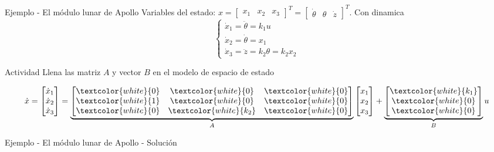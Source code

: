 \documentclass[presentation,aspectratio=1610]{beamer}
\begin{document}
\begin{frame}[label={sec:orga0c19d9}]{Ejemplo - El módulo lunar de Apollo}
Variables del estado: \(x = \begin{bmatrix} x_1 & x_2 & x_3 \end{bmatrix}^T = \begin{bmatrix} \dot{\theta} & \theta & \dot{z} \end{bmatrix}^T\). Con dinamica
\[ \begin{cases} \dot{x}_1 =  \ddot{\theta} = k_1 u\\ \dot{x}_2 = \dot{\theta} = x_1\\ \dot{x}_3 = \ddot{z} = k_2\theta = k_2x_2 \end{cases} \]

\alert{Actividad} Llena las matriz \(A\) y vector \(B\) en el modelo de espacio de estado

\[ \dot{x} = \begin{bmatrix} \dot{x}_1\\\dot{x}_2\\\dot{x}_3\end{bmatrix} = \underbrace{\begin{bmatrix} \textcolor{white}{0} & \textcolor{white}{0} &\textcolor{white}{0} \\\textcolor{white}{1} & \textcolor{white}{0}& \textcolor{white}{0}\\ \textcolor{white}{0}& \textcolor{white}{k_2} &\textcolor{white}{0} \end{bmatrix}}_{A} \begin{bmatrix} x_1\\x_2\\x_3\end{bmatrix} + \underbrace{\begin{bmatrix} \textcolor{white}{k_1} \\ \textcolor{white}{0} \\\textcolor{white}{0}  \end{bmatrix}}_{B} u \]
\end{frame}

\begin{frame}[label={sec:org4eaa326}]{Ejemplo - El módulo lunar de Apollo - Solución}
\end{frame}
\end{document}
